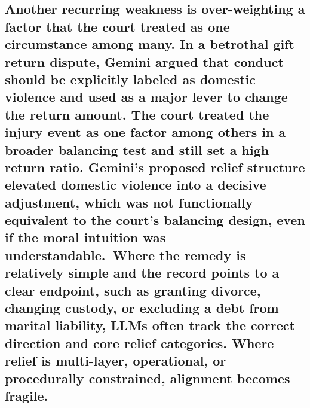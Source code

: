 {{{{{{{{{{{{{{{{{\subsection{\texorpdfstring{Another recurring weakness is over-weighting a factor that the court treated as one circumstance among many. In a betrothal gift return dispute, Gemini argued that conduct should be explicitly labeled as domestic violence and used as a major lever to change the return amount. The court treated the injury event as one factor among others in a broader balancing test and still set a high return ratio. Gemini's proposed relief structure elevated domestic violence into a decisive adjustment, which was not functionally equivalent to the court's balancing design, even if the moral intuition was understandable.~Where the remedy is relatively simple and the record points to a clear endpoint, such as granting divorce, changing custody, or excluding a debt from marital liability, LLMs often track the correct direction and core relief categories. Where relief is multi-layer, operational, or procedurally constrained, alignment becomes fragile. }{Another recurring weakness is over-weighting a factor that the court treated as one circumstance among many. In a betrothal gift return dispute, Gemini argued that conduct should be explicitly labeled as domestic violence and used as a major lever to change the return amount. The court treated the injury event as one factor among others in a broader balancing test and still set a high return ratio. Gemini's proposed relief structure elevated domestic violence into a decisive adjustment, which was not functionally equivalent to the court's balancing design, even if the moral intuition was understandable.~Where the remedy is relatively simple and the record points to a clear endpoint, such as granting divorce, changing custody, or excluding a debt from marital liability, LLMs often track the correct direction and core relief categories. Where relief is multi-layer, operational, or procedurally constrained, alignment becomes fragile. }}\label{another-recurring-weakness-is-over-weighting-a-factor-that-the-court-treated-as-one-circumstance-among-many.-in-a-betrothal-gift-return-dispute-gemini-argued-that-conduct-should-be-explicitly-labeled-as-domestic-violence-and-used-as-a-major-lever-to-change-the-return-amount.-the-court-treated-the-injury-event-as-one-factor-among-others-in-a-broader-balancing-test-and-still-set-a-high-return-ratio.-geminis-proposed-relief-structure-elevated-domestic-violence-into-a-decisive-adjustment-which-was-not-functionally-equivalent-to-the-courts-balancing-design-even-if-the-moral-intuition-was-understandable.-where-the-remedy-is-relatively-simple-and-the-record-points-to-a-clear-endpoint-such-as-granting-divorce-changing-custody-or-excluding-a-debt-from-marital-liability-llms-often-track-the-correct-direction-and-core-relief-categories.-where-relief-is-multi-layer-operational-or-procedurally-constrained-alignment-becomes-fragile.}

}}}}}}}}}}}}}}}}}
